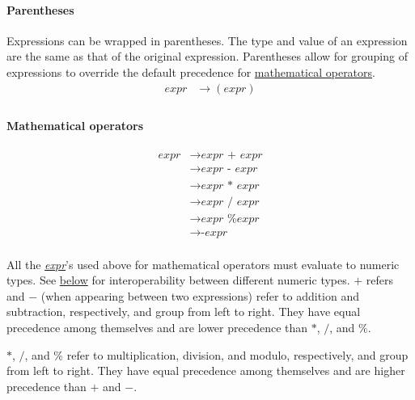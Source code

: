 \documentclass{article}
\begin{document}
\paragraph{Parentheses}
Expressions can be wrapped in parentheses. The type and value of an expression are the same as that of the original expression. Parentheses allow for grouping of expressions to override the default precedence for \hyperref[sec:expr-mathematical-operators]{mathematical operators}.
\begin{align*}
    \textit{expr} &\to (\hyperref[sec:expr]{\textit{expr}}) \\
\end{align*}

\paragraph{Mathematical operators}
\label{sec:expr-mathematical-operators}
\begin{align*}
    \textit{expr} &\to \hyperref[sec:expr]{\textit{expr}} \texttt{ + } \hyperref[sec:expr]{\textit{expr}} \\
    &\to \hyperref[sec:expr]{\textit{expr}} \texttt{ - } \hyperref[sec:expr]{\textit{expr}} \\
    &\to \hyperref[sec:expr]{\textit{expr}} \texttt{ * } \hyperref[sec:expr]{\textit{expr}} \\
    &\to \hyperref[sec:expr]{\textit{expr}} \texttt{ / } \hyperref[sec:expr]{\textit{expr}} \\
    &\to \hyperref[sec:expr]{\textit{expr}} \texttt{ \% } \hyperref[sec:expr]{\textit{expr}} \\
    &\to \texttt{-}\hyperref[sec:expr]{\textit{expr}} \\
\end{align*}

All the \hyperref[sec:expr]{\textit{expr}}'s used above for mathematical operators must evaluate to numeric types. See \hyperref[sec:conversions]{below} for interoperability between different numeric types. \(+\) refers and \(-\) (when appearing between two expressions) refer to addition and subtraction, respectively, and group from left to right. They have equal precedence among themselves and are lower precedence than \(*\), \(/\), and \(\%\).

\(*\), \(/\), and \(\%\) refer to multiplication, division, and modulo, respectively, and group from left to right. They have equal precedence among themselves and are higher precedence than \(+\) and \(-\).
\end{document}
